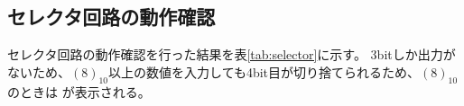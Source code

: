\documentclass[a4paper,11pt]{ltjsarticle}
\begin{document}
\subsection{セレクタ回路の動作確認}
セレクタ回路の動作確認を行った結果を表\ref{tab:selector}に示す。
3bitしか出力がないため、$(8)_10$以上の数値を入力しても4bit目が切り捨てられるため、$(8)_10$のときは 
 が表示される。
\end{document}
